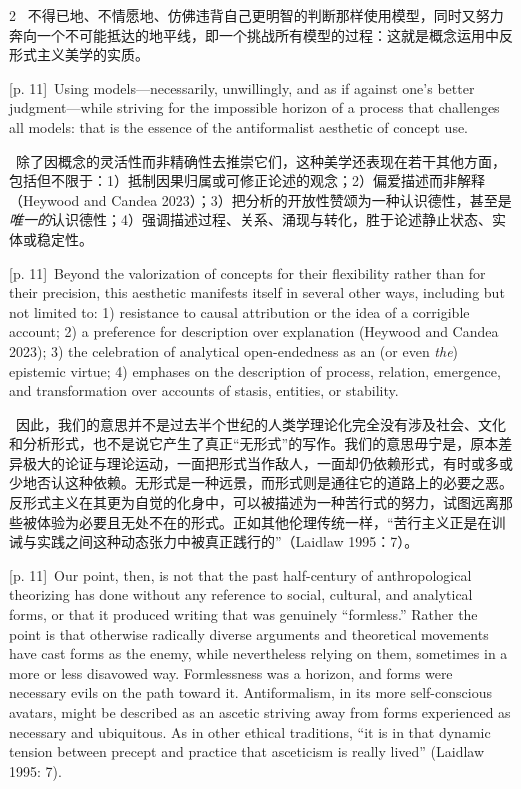 \documentclass[10pt,a4paper]{article}
\begin{document}
\begin{paracol}{2}
\switchcolumn*
{\scriptsize\color{gray} [p. 11]}\ 不得已地、不情愿地、仿佛违背自己更明智的判断那样使用模型，同时又努力奔向一个不可能抵达的地平线，即一个挑战所有模型的过程：这就是概念运用中反形式主义美学的实质。\par
\switchcolumn
{\scriptsize\color{gray} [p. 11]}\ Using models—necessarily, unwillingly, and as if against one’s better judgment—while striving for the impossible horizon of a process that challenges all models: that is the essence of the antiformalist aesthetic of concept use.\par
\switchcolumn*
{\scriptsize\color{gray} [p. 11]}\ 除了因概念的灵活性而非精确性去推崇它们，这种美学还表现在若干其他方面，包括但不限于：1）抵制因果归属或可修正论述的观念；2）偏爱描述而非解释（Heywood and Candea 2023）；3）把分析的开放性赞颂为一种认识德性，甚至是\textit{唯一的}认识德性；4）强调描述过程、关系、涌现与转化，胜于论述静止状态、实体或稳定性。\par
\switchcolumn
{\scriptsize\color{gray} [p. 11]}\ Beyond the valorization of concepts for their flexibility rather than for their precision, this aesthetic manifests itself in several other ways, including but not limited to: 1) resistance to causal attribution or the idea of a corrigible account; 2) a preference for description over explanation (Heywood and Candea 2023); 3) the celebration of analytical open-endedness as an (or even \textit{the}) epistemic virtue; 4) emphases on the description of process, relation, emergence, and transformation over accounts of stasis, entities, or stability.\par
\switchcolumn*
{\scriptsize\color{gray} [p. 11]}\ 因此，我们的意思并不是过去半个世纪的人类学理论化完全没有涉及社会、文化和分析形式，也不是说它产生了真正“无形式”的写作。我们的意思毋宁是，原本差异极大的论证与理论运动，一面把形式当作敌人，一面却仍依赖形式，有时或多或少地否认这种依赖。无形式是一种远景，而形式则是通往它的道路上的必要之恶。反形式主义在其更为自觉的化身中，可以被描述为一种苦行式的努力，试图远离那些被体验为必要且无处不在的形式。正如其他伦理传统一样，“苦行主义正是在训诫与实践之间这种动态张力中被真正践行的”（Laidlaw 1995：7）。\par
\switchcolumn
{\scriptsize\color{gray} [p. 11]}\ Our point, then, is not that the past half-century of anthropological theorizing has done without any reference to social, cultural, and analytical forms, or that it produced writing that was genuinely “formless.” Rather the point is that otherwise radically diverse arguments and theoretical movements have cast forms as the enemy, while nevertheless relying on them, sometimes in a more or less disavowed way. Formlessness was a horizon, and forms were necessary evils on the path toward it. Antiformalism, in its more self-conscious avatars, might be described as an ascetic striving away from forms experienced as necessary and ubiquitous. As in other ethical traditions, “it is in that dynamic tension between precept and practice that asceticism is really lived” (Laidlaw 1995: 7).\par

\end{paracol}
\end{document}
